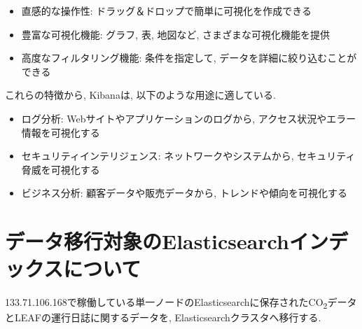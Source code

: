 \begin{itemize}
  \item 直感的な操作性: ドラッグ＆ドロップで簡単に可視化を作成できる
  \item 豊富な可視化機能: グラフ, 表, 地図など, さまざまな可視化機能を提供
  \item 高度なフィルタリング機能: 条件を指定して, データを詳細に絞り込むことができる
\end{itemize}

これらの特徴から, Kibanaは, 以下のような用途に適している.

\begin{itemize}
  \item ログ分析: Webサイトやアプリケーションのログから, アクセス状況やエラー情報を可視化する
  \item セキュリティインテリジェンス: ネットワークやシステムから, セキュリティ脅威を可視化する
  \item ビジネス分析: 顧客データや販売データから, トレンドや傾向を可視化する
\end{itemize}




\section{データ移行対象のElasticsearchインデックスについて}

133.71.106.168で稼働している単一ノードのElasticsearchに保存されたCO\textsubscript{2}データとLEAFの運行日誌に関するデータを, Elasticsearchクラスタへ移行する.

